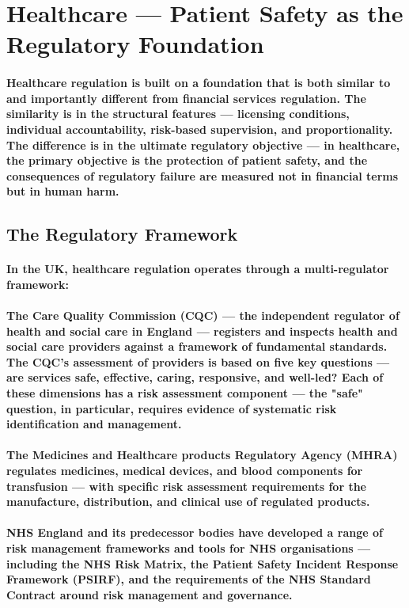 \section{Healthcare — Patient Safety as the Regulatory Foundation}
\paragraph{Healthcare regulation is built on a foundation that is both similar to and importantly different from financial services regulation. The similarity is in the structural features — licensing conditions, individual accountability, risk-based supervision, and proportionality. The difference is in the ultimate regulatory objective — in healthcare, the primary objective is the protection of patient safety, and the consequences of regulatory failure are measured not in financial terms but in human harm.}

\subsection{The Regulatory Framework}
\paragraph{In the UK, healthcare regulation operates through a multi-regulator framework:}
\paragraph{\textbf{The Care Quality Commission (CQC)} — the independent regulator of health and social care in England — registers and inspects health and social care providers against a framework of fundamental standards. The CQC's assessment of providers is based on five key questions — are services \textbf{safe, effective, caring, responsive, and well-led?} Each of these dimensions has a risk assessment component — the "safe" question, in particular, requires evidence of systematic risk identification and management.}
\paragraph{\textbf{The Medicines and Healthcare products Regulatory Agency (MHRA)} regulates medicines, medical devices, and blood components for transfusion — with specific risk assessment requirements for the manufacture, distribution, and clinical use of regulated products.}
\paragraph{\textbf{NHS England} and its predecessor bodies have developed a range of risk management frameworks and tools for NHS organisations — including the \textbf{NHS Risk Matrix}, the \textbf{Patient Safety Incident Response Framework (PSIRF)}, and the requirements of the \textbf{NHS Standard Contract} around risk management and governance.}
